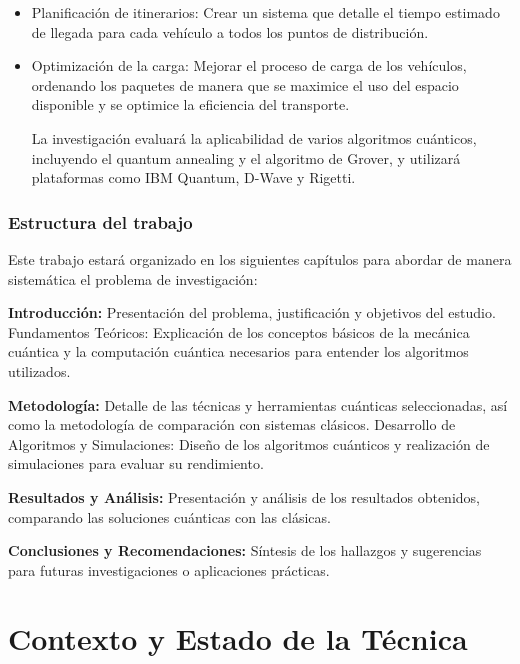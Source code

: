 \documentclass[11pt,a4paper,spanish]{book}
\begin{document}
\begin{itemize}
\begin{itemize}
            \item Planificación de itinerarios: Crear un sistema que detalle el tiempo estimado de llegada para cada vehículo a todos los puntos de distribución.

            \item Optimización de la carga: Mejorar el proceso de carga de los vehículos, ordenando los paquetes de manera que se maximice el uso del espacio disponible y se optimice la eficiencia del transporte.

            La investigación evaluará la aplicabilidad de varios algoritmos cuánticos, incluyendo el quantum annealing y el algoritmo de Grover, y utilizará plataformas como IBM Quantum, D-Wave y Rigetti.
        \end{itemize}


        \subsection{Estructura del trabajo}

        Este trabajo estará organizado en los siguientes capítulos para abordar de manera sistemática el problema de investigación:

        \textbf{Introducción:} Presentación del problema, justificación y objetivos del estudio.
        Fundamentos Teóricos: Explicación de los conceptos básicos de la mecánica cuántica y la computación cuántica necesarios para entender los algoritmos utilizados.

        \textbf{Metodología:} Detalle de las técnicas y herramientas cuánticas seleccionadas, así como la metodología de comparación con sistemas clásicos.
        Desarrollo de Algoritmos y Simulaciones: Diseño de los algoritmos cuánticos y realización de simulaciones para evaluar su rendimiento.

        \textbf{Resultados y Análisis:} Presentación y análisis de los resultados obtenidos, comparando las soluciones cuánticas con las clásicas.

        \textbf{ Conclusiones y Recomendaciones:} Síntesis de los hallazgos y sugerencias para futuras investigaciones o aplicaciones prácticas.

    \end{itemize}

    \chapter{Contexto y Estado de la Técnica}
\end{document}
